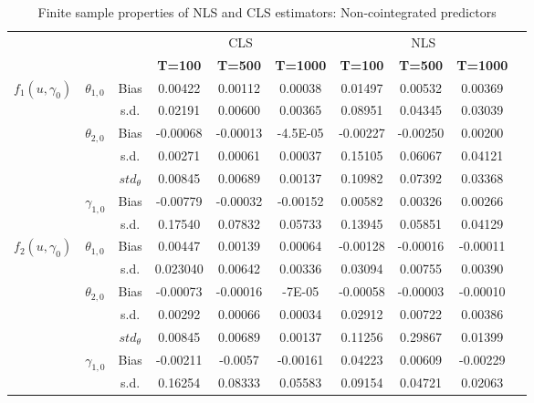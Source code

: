 \documentclass[a4paper,12pt,times,numbered,print,index]{report}
\numberwithin{equation}{section}
\begin{document}
	
	\begin{table}[htbp]
		\centering
		\caption{Finite sample properties of NLS and CLS estimators: Non-cointegrated predictors}
		\label{Table CLS}
		\begin{adjustbox}{max width=0.95\textwidth}
			\begin{tabular}{clcccccccc}
				\hline \hline
				&   &   & \multicolumn{3}{c}{CLS} & \multicolumn{3}{c}{NLS} \\
				&   &   & \textbf{T=100} & \textbf{T=500} & \textbf{T=1000} & \textbf{T=100} & \textbf{T=500} & \textbf{T=1000} \\
				\hline
				
				\multirow{6}[0]{*}{$f_1(u,\gamma_{0})$} &\multirow{2}[0]{*}{$\theta_{1,0}$} & Bias  & 0.00422 & 0.00112 & 0.00038 & 0.01497 & 0.00532 & 0.00369 \\
				&	& s.d.  & 0.02191 & 0.00600 & 0.00365 & 0.08951 & 0.04345 & 0.03039 \\
				&\multirow{2}[0]{*}{$\theta_{2,0}$} & Bias  & -0.00068 & -0.00013 & -4.5E-05 & -0.00227 & -0.00250 & 0.00200 \\
				&	& s.d.  & 0.00271 & 0.00061 & 0.00037 & 0.15105 & 0.06067 & 0.04121 \\
				&	& $std_{\theta}$  & 0.00845 & 0.00689 & 0.00137 & 0.10982 & 0.07392 & 0.03368 \\
				&\multirow{2}[0]{*}{$\gamma_{1,0}$} & Bias  & -0.00779 & -0.00032 & -0.00152 & 0.00582 & 0.00326 & 0.00266 \\
				&	& s.d.  & 0.17540 & 0.07832 & 0.05733 & 0.13945 & 0.05851 & 0.04129 \\
				
				\hline
				
				\multirow{6}[0]{*}{$f_2(u,\gamma_{0})$} & \multirow{2}[0]{*}{$\theta_{1,0}$} & Bias & 0.00447 & 0.00139 & 0.00064 & -0.00128 & -0.00016 & -0.00011 \\
				&   & s.d. & 0.023040 & 0.00642 & 0.00336 & 0.03094 & 0.00755 & 0.00390 \\
				& \multirow{2}[0]{*}{$\theta_{2,0}$} & Bias & -0.00073 & -0.00016 & -7E-05 & -0.00058 & -0.00003 & -0.00010 \\
				&   & s.d. & 0.00292 & 0.00066 & 0.00034 & 0.02912 & 0.00722 & 0.00386 \\
				&	& $std_{\theta}$  & 0.00845 & 0.00689 & 0.00137 & 0.11256 & 0.29867 & 0.01399 \\
				& \multirow{2}[0]{*}{$\gamma_{1,0}$} & Bias & -0.00211 & -0.0057 & -0.00161 & 0.04223 & 0.00609 & -0.00229 \\
				&   & s.d. & 0.16254 & 0.08333 & 0.05583 & 0.09154 & 0.04721 & 0.02063 \\
				

\end{tabular}
\end{adjustbox}
\end{table}
\end{document}
